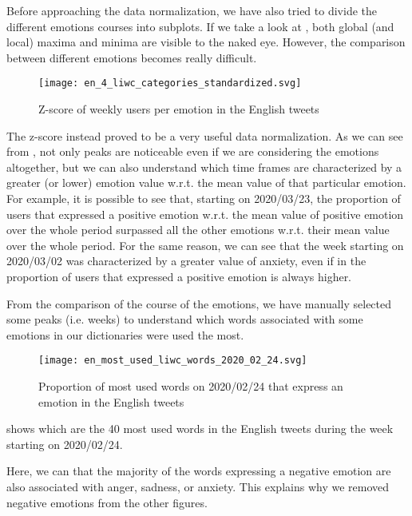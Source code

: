 Before approaching the data normalization, we have also tried to divide the different emotions courses into subplots. If we take a look at , both global (and local) maxima and minima are visible to the naked eye. However, the comparison between different emotions becomes really difficult.

\begin{figure}[H]
	\centering
    	\texttt{[image: en\_4\_liwc\_categories\_standardized.svg]}
    	\caption{Z-score of weekly users per emotion in the English tweets}
    	\label{fig:en-4-liwc-categories-std}
\end{figure}

The z-score instead proved to be a very useful data normalization. As we can see from , not only peaks are noticeable even if we are considering the emotions altogether, but we can also understand which time frames are characterized by a greater (or lower) emotion value w.r.t. the mean value of that particular emotion. For example, it is possible to see that, starting on 2020/03/23, the proportion of users that expressed a positive emotion w.r.t. the mean value of positive emotion over the whole period surpassed all the other emotions w.r.t. their mean value over the whole period. For the same reason, we can see that the week starting on 2020/03/02 was characterized by a greater value of anxiety, even if in  the proportion of users that expressed a positive emotion is always higher.

From the comparison of the course of the emotions, we have manually selected some peaks (i.e. weeks) to understand which words associated with some emotions in our dictionaries were used the most. 

\begin{figure}[H]
	\centering
    	\texttt{[image: en\_most\_used\_liwc\_words\_2020\_02\_24.svg]}
    	\caption{Proportion of most used words on 2020/02/24 that express an emotion in the English tweets}
    	\label{fig:en-most-used-liwc-words-2020-02-24}
\end{figure}

 shows which are the 40 most used words in the English tweets during the week starting on 2020/02/24.

Here, we can that the majority of the words expressing a negative emotion are also associated with anger, sadness, or anxiety. This explains why we removed negative emotions from the other figures.

